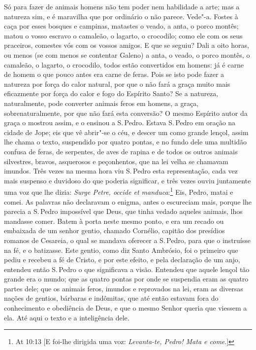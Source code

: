 Só para fazer de animais homens não tem poder nem habilidade a arte; mas
a natureza sim, e é maravilha que por ordinário o não parece. Vede"-a.
Fostes à caça por esses bosques e campinas, matastes o veado, a anta, o
porco montês; matou o vosso escravo o camaleão, o lagarto, o crocodilo;
como ele com os seus praceiros, comestes vós com os vossos amigos. E que
se seguiu? Dali a oito horas, ou menos (se com menos se contentar
Galeno) a anta, o veado, o porco montês, o camaleão, o lagarto, o
crocodilo, todos estão convertidos em homens: já é carne de homem o que
pouco antes era carne de feras. Pois se isto pode fazer a natureza por
força do calor natural, por que o não fará a graça muito mais
eficazmente por força do calor e fogo do Espírito Santo? Se a natureza,
naturalmente, pode converter animais feros em homens, a graça,
sobrenaturalmente, por que não fará esta conversão? O mesmo Espírito
autor da graça o mostrou assim, e o ensinou a S.\,Pedro. Estava S.\,Pedro
em oração na cidade de Jope; eis que vê abrir"-se o céu, e descer um como
grande lençol, assim lhe chama o texto, suspendido por quatro
pontas, e no fundo dele uma multidão confusa de feras, de serpentes, de
aves de rapina e de todos os outros animais silvestres, bravos,
asquerosos e peçonhentos, que na lei velha se chamavam imundos. Três
vezes na mesma hora viu S.\,Pedro esta representação, cada vez mais
suspenso e duvidoso do que poderia significar, e três vezes ouviu
juntamente uma voz que lhe dizia: \emph{Surge Petre, occide et manduca}:\footnote{At 10:13 [E foi-lhe dirigida uma voz: \emph{Levanta-te, Pedro! Mata e come}.]}
Eis, Pedro, matai e comei. As palavras não declaravam
o enigma, antes o escureciam mais, porque lhe parecia a S.\,Pedro
impossível que Deus, que tinha vedado aqueles animais, lhos mandasse
comer. Batem à porta neste mesmo ponto, e era um recado ou embaixada de
um senhor gentio, chamado Cornélio, capitão dos presídios romanos de
Cesareia, o qual se mandava oferecer a S.\,Pedro, para que o instruísse
na fé, e o batizasse. Este gentio, como diz Santo Ambrósio, foi o
primeiro que pediu e recebeu a fé de Cristo, e por este efeito, e pela
declaração de um anjo, entendeu então S.\,Pedro o que significava a
visão. Entendeu que aquele lençol tão grande era o mundo; que as quatro
pontas por onde se suspendia eram as quatro partes dele; que os animais
feros, imundos e reprovados na lei, eram as diversas nações de gentios,
bárbaras e indômitas, que até então estavam fora do conhecimento e
obediência de Deus, e que o mesmo Senhor queria que viessem a ela. Até
aqui o texto e a inteligência dele.

